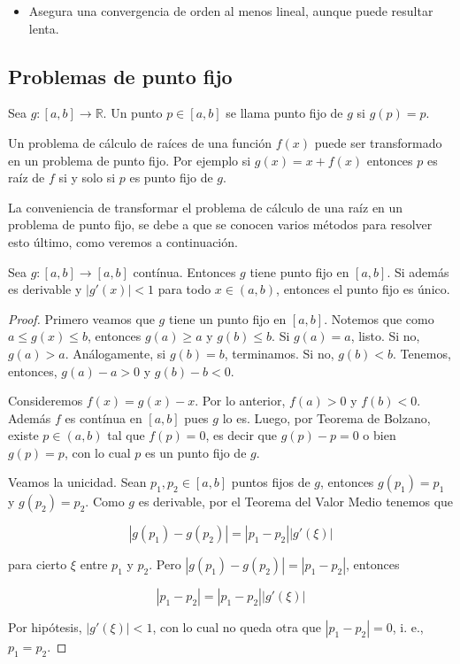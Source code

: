 \begin{itemize}
	\item Asegura una convergencia de orden al menos lineal, aunque puede resultar lenta.
\end{itemize}

\subsection{Problemas de punto fijo}

\begin{defi}
Sea $g: [a, b] \to \mathbb{R}$. Un punto $p \in [a, b]$ se llama punto fijo de $g$ si $g(p) = p$.
\end{defi}

Un problema de cálculo de raíces de una función $f(x)$ puede ser transformado en un problema de punto fijo. Por ejemplo si $g(x) = x + f(x)$ entonces $p$ es raíz de $f$ si y solo si $p$ es punto fijo de $g$.

La conveniencia de transformar el problema de cálculo de una raíz en un problema de punto fijo, se debe a que se conocen varios métodos para resolver esto último, como veremos a continuación.

\begin{propo}
Sea $g:[a, b] \to [a, b]$ contínua. Entonces $g$ tiene punto fijo en $[a, b]$. Si además es derivable y $|g'(x)| < 1$ para todo $x \in (a, b)$, entonces el punto fijo es único.

\begin{proof}
Primero veamos que $g$ tiene un punto fijo en $[a, b]$. Notemos que como $a \leq g(x) \leq b$, entonces $g(a) \geq a$ y $g(b) \leq b$. Si $g(a) = a$, listo. Si no, $g(a) > a$. Análogamente, si $g(b) = b$, terminamos. Si no, $g(b) < b$. Tenemos, entonces, $g(a) - a > 0$ y $g(b) - b < 0$.

Consideremos $f(x) = g(x) - x$. Por lo anterior, $f(a) > 0$ y $f(b) < 0$. Además $f$ es contínua en $[a, b]$ pues $g$ lo es. Luego, por Teorema de Bolzano, existe $p \in (a, b)$ tal que $f(p) = 0$, es decir que $g(p) - p = 0$ o bien $g(p) = p$, con lo cual $p$ es un punto fijo de $g$.

Veamos la unicidad. Sean $p_1, p_2 \in [a, b]$ puntos fijos de $g$, entonces $g(p_1) = p_1$ y $g(p_2) = p_2$. Como $g$ es derivable, por el Teorema del Valor Medio tenemos que

\[|g(p_1) - g(p_2)| = \left|p_1 - p_2\right| \left|g'(\xi)\right|\]

para cierto $\xi$ entre $p_1$ y $p_2$. Pero $|g(p_1) - g(p_2)| = |p_1 - p_2|$, entonces

\[|p_1 - p_2| = \left|p_1 - p_2\right| \left|g'(\xi)\right|\]

Por hipótesis, $\left|g'(\xi)\right| < 1$, con lo cual no queda otra que $|p_1 - p_2| = 0$, i. e., $p_1 = p_2$.

\end{proof}
\end{propo}

